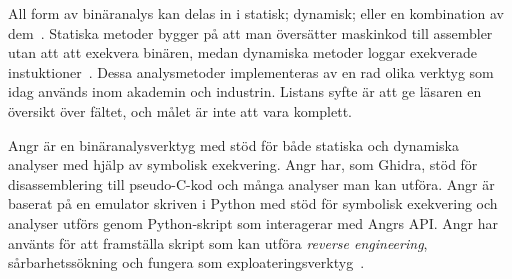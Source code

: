 All form av binäranalys kan delas in i statisk; dynamisk; eller en kombination
av dem~\cite{andriesse2018}. Statiska metoder bygger på att man översätter
maskinkod till assembler utan att att exekvera binären, medan dynamiska
metoder loggar exekverade instuktioner~\cite{andriesse2018}. Dessa analysmetoder
implementeras av en rad olika verktyg som idag används inom akademin och
industrin. Listans syfte är att ge läsaren en översikt över fältet, och målet är
inte att vara komplett.



Angr är en binäranalysverktyg med stöd för både statiska och dynamiska analyser
med hjälp av symbolisk exekvering. Angr har, som Ghidra, stöd för
disassemblering till pseudo-C-kod och många analyser man kan utföra. Angr är
baserat på en emulator skriven i Python med stöd för symbolisk exekvering och
analyser utförs genom Python-skript som interagerar med Angrs API. Angr har
använts för att framställa skript som kan utföra \emph{reverse engineering},
sårbarhetssökning och fungera som exploateringsverktyg~\cite{angr_docs}.
